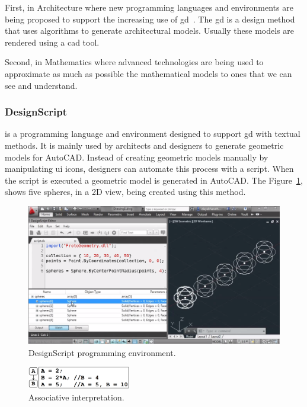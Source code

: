 First, in Architecture where new programming languages and environments are being proposed to support the increasing use of \ac{gd}~\cite{mccormack2004generative}. The \ac{gd} is a design method that uses algorithms to generate architectural models. Usually these models are rendered using a \ac{cad} tool. 

Second, in Mathematics where advanced technologies are being used to approximate as much as possible the mathematical models to ones that we can see and understand.

\subsubsection{DesignScript~\cite{aish2012designscript}} is a programming language and environment designed to support \ac{gd} with textual methods. It is mainly used by architects and designers to generate geometric models for AutoCAD. Instead of creating geometric models manually by manipulating \ac{ui} icons, designers can automate this process with a script. When the script is executed a geometric model is generated in AutoCAD. The Figure~\ref{fig:ds}, shows five spheres, in a 2D view, being created using this method.

\begin{figure}[!htbp]
\vspace{-5pt}
  \centering
  \includegraphics[width=1.0\textwidth]{img/designScriptIDE}
  \vspace{-20pt}
    \caption{DesignScript programming environment.} 
    \vspace{-10pt} 
  \label{fig:ds}
\end{figure} 


\begin{figure}
  \vspace{-25pt}
  \begin{center}
    \includegraphics[width=0.4\textwidth]{img/designscript}
  \end{center}
  \vspace{-20pt}
 \caption{Associative interpretation.}  
  \vspace{-20pt}
    \label{fig:designscript}
\end{figure}

